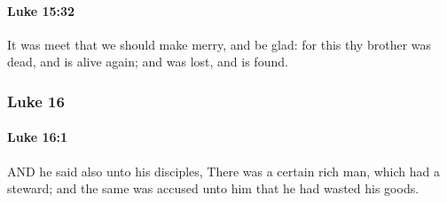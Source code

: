 		\paragraph{Luke 15:32} %
			\label{LUKE-15-32}

			It was meet that we should make merry, and be glad: for this thy brother was dead, and is alive again; and was lost, and is found.

			\begin{framed}
			\scriptsize
				\begin{compactdesc}
					\item[SBLG] 
				\end{compactdesc}
			\end{framed}

	\subsubsection{Luke 16} %
		\label{LUKE-16}
		
		\paragraph{Luke 16:1} %
			\label{LUKE-16-1}

			AND he said also unto his disciples, There was a certain rich man, which had a steward; and the same was accused unto him that he had wasted his goods.

